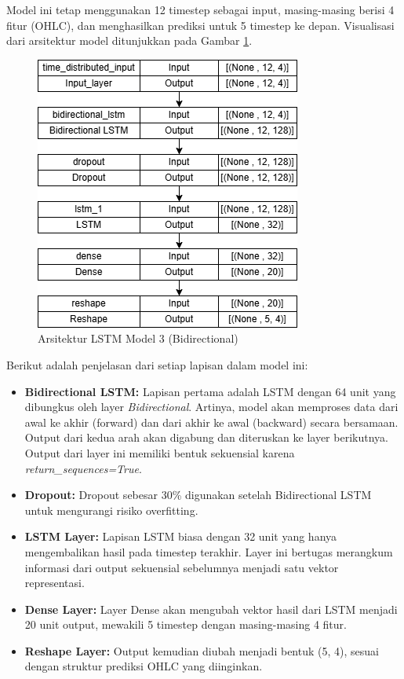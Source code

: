 Model ini tetap menggunakan 12 timestep sebagai input, masing-masing berisi 4 fitur (OHLC), dan menghasilkan prediksi untuk 5 timestep ke depan. Visualisasi dari arsitektur model ditunjukkan pada Gambar \ref{fig:lstm3}.

\begin{figure} [H] \centering
    \includegraphics[scale=0.65]{gambar/lstmmodel3.png} 
    \caption{Arsitektur LSTM Model 3 (Bidirectional)}
    \label{fig:lstm3}
\end{figure}

Berikut adalah penjelasan dari setiap lapisan dalam model ini:

\begin{itemize}
    \item \textbf{Bidirectional LSTM:} Lapisan pertama adalah LSTM dengan 64 unit yang dibungkus oleh layer \textit{Bidirectional}. Artinya, model akan memproses data dari awal ke akhir (forward) dan dari akhir ke awal (backward) secara bersamaan. Output dari kedua arah akan digabung dan diteruskan ke layer berikutnya. Output dari layer ini memiliki bentuk sekuensial karena \textit{return\_sequences=True}.
    
    \item \textbf{Dropout:} Dropout sebesar 30\% digunakan setelah Bidirectional LSTM untuk mengurangi risiko overfitting.
    
    \item \textbf{LSTM Layer:} Lapisan LSTM biasa dengan 32 unit yang hanya mengembalikan hasil pada timestep terakhir. Layer ini bertugas merangkum informasi dari output sekuensial sebelumnya menjadi satu vektor representasi.
    
    \item \textbf{Dense Layer:} Layer Dense akan mengubah vektor hasil dari LSTM menjadi 20 unit output, mewakili 5 timestep dengan masing-masing 4 fitur.
    
    \item \textbf{Reshape Layer:} Output kemudian diubah menjadi bentuk (5, 4), sesuai dengan struktur prediksi OHLC yang diinginkan.
\end{itemize}

